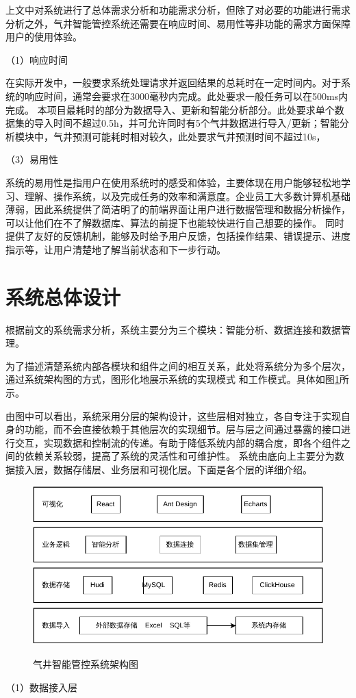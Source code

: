 上文中对系统进行了总体需求分析和功能需求分析，但除了对必要的功能进行需求分析之外，气井智能管控系统还需要在响应时间、易用性等非功能的需求方面保障用户的使用体验。

（1）响应时间

在实际开发中，一般要求系统处理请求并返回结果的总耗时在一定时间内。对于系统的响应时间，通常会要求在3000毫秒内完成。此处要求一般任务可以在500ms内完成。
本项目最耗时的部分为数据导入、更新和智能分析部分。此处要求单个数据集的导入时间不超过0.5h，并可允许同时有5个气井数据进行导入/更新；智能分析模块中，气井预测可能耗时相对较久，此处要求气井预测时间不超过10s，

（3）易用性

系统的易用性是指用户在使用系统时的感受和体验，主要体现在用户能够轻松地学习、理解、操作系统，以及完成任务的效率和满意度。企业员工大多数计算机基础薄弱，因此系统提供了简洁明了的前端界面让用户进行数据管理和数据分析操作，可以让他们在不了解数据库、算法的前提下也能较快进行自己想要的操作。
同时提供了友好的反馈机制，能够及时给予用户反馈，包括操作结果、错误提示、进度指示等，让用户清楚地了解当前状态和下一步行动。
\section{系统总体设计}
根据前文的系统需求分析，系统主要分为三个模块：智能分析、数据连接和数据管理。

为了描述清楚系统内部各模块和组件之间的相互关系，此处将系统分为多个层次，通过系统架构图的方式，图形化地展示系统的实现模式
和工作模式。具体如图\ref{fig:sysstruc}所示。

由图中可以看出，系统采用分层的架构设计，这些层相对独立，各自专注于实现自身的功能，而不会直接依赖于其他层次的实现细节。层与层之间通过暴露的接口进行交互，实现数据和控制流的传递。有助于降低系统内部的耦合度，即各个组件之间的依赖关系较弱，提高了系统的灵活性和可维护性。
系统由底向上主要分为数据接入层，数据存储层、业务层和可视化层。下面是各个层的详细介绍。
\begin{figure}[H]
    \centering
    \caption{气井智能管控系统架构图}
    \includegraphics[width=.9\linewidth]{figure/系统架构图.pdf}
    \label{fig:sysstruc}
\end{figure}
（1）数据接入层

